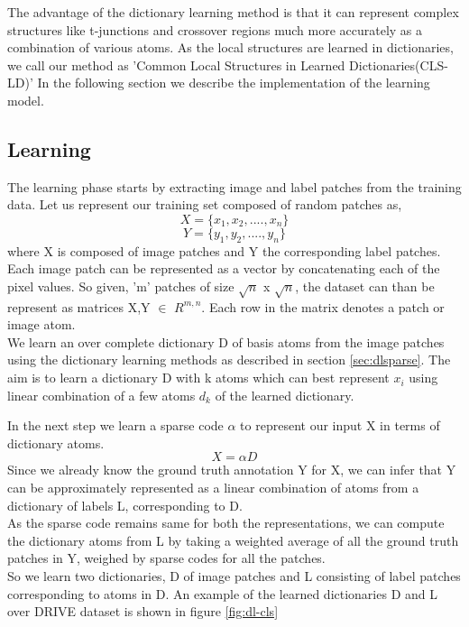 The advantage of the dictionary learning method is that it can represent complex structures like t-junctions and crossover regions much more accurately as a combination of various atoms.
As the local structures are learned in dictionaries, we call our method as 'Common Local Structures in Learned Dictionaries(CLS-LD)'
In the following section we describe the implementation of the learning model.

\subsection{Learning}
The learning phase starts by extracting image and label patches from the training data. Let us represent our training set composed of random patches as,
$$
X = \{x_1,x_2,....,x_n\}
$$
$$
Y = \{y_1,y_2,....,y_n\}
$$
where X is composed of image patches and Y the corresponding label patches. Each image patch can be represented as a vector by concatenating each of the pixel values. So given, 'm' patches of size $\sqrt{n}$ x $\sqrt{n}$, the dataset can than be represent as matrices 
X,Y $\in$ $R^{m,n}$. Each row in the matrix denotes a patch or image atom.\\

We learn an over complete dictionary D of basis atoms from the image patches using the dictionary learning methods as described in section \ref{sec:dlsparse}. The aim is to learn a dictionary D with k atoms which can best represent $x_i$ using linear combination of a few atoms $d_k$ of the learned dictionary.

In the next step we learn a sparse code $\alpha$ to represent our input X in terms of dictionary atoms.
$$
X = \alpha D
$$ 
Since we already know the ground truth annotation Y for X, we can infer that Y can be approximately represented as a linear combination of atoms from a dictionary of labels L, corresponding to D.\\

As the sparse code remains same for both the representations, we can compute the dictionary atoms from L by taking a weighted average of all the ground truth patches in Y, weighed by sparse codes for all the patches.\\

So we learn two dictionaries, D of image patches and L consisting of label patches corresponding to atoms in D. An example of the learned dictionaries D and L over DRIVE dataset is shown in figure \ref{fig:dl-cls}

